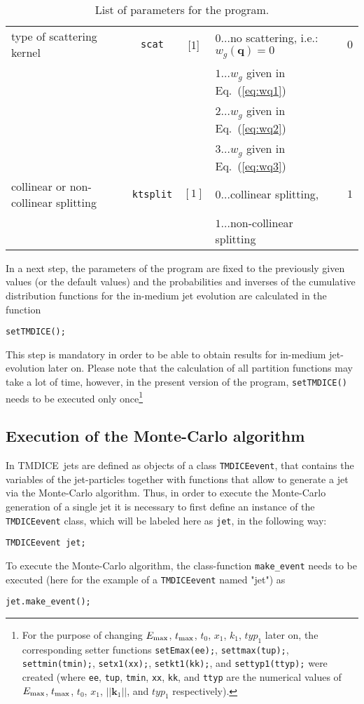 \documentclass[preprint,12pt]{elsarticle}
\newcommand{\tmdice}{{\sf TMDICE}}
\begin{document}
\begin{table}[h!]
\begin{tabular}{p{7.5cm}|c|c|p{3.8cm}|c}
         type of scattering kernel &\verb#scat#&[1]&$0\dots$no scattering, i.e.: $w_g(\mathbf{q})=0$&$0$\\&&& $1\dots w_g$ given in Eq.~(\ref{eq:wq1})
         \\&&& $2\dots w_g$ given in Eq.~(\ref{eq:wq2})
         \\&&& $3\dots w_g$ given in Eq.~(\ref{eq:wq3})&
         \\
         collinear or non-collinear splitting&\verb#ktsplit#&$[1]$&$0\dots$collinear splitting,&$1$\\
         &&&$1\dots$non-collinear splitting\\
     \end{tabular}
    \caption{List of parameters for the program.}
    \label{tab:med_params}
\end{table}

In a next step, the parameters of the program are fixed to the previously given values (or the default values) and the probabilities and inverses of the cumulative distribution functions for the in-medium jet evolution are calculated in the function 
\begin{verbatim}
setTMDICE();
\end{verbatim}
This step is mandatory in order to be able to obtain results for in-medium jet-evolution later on.
Please note that the calculation of all partition functions may take a lot of time, however, in the present version of the program, \verb#setTMDICE()# needs to be executed only once\footnote{For the purpose of changing $E_{\rm max}$, $t_{\rm max}$, $t_0$, $x_1$, $k_1$, $typ_1$ later on, the corresponding setter functions \verb|setEmax(ee);|, \verb|settmax(tup);|, \verb|settmin(tmin);|, \verb|setx1(xx);|, \verb|setkt1(kk);|, and \verb|settyp1(ttyp);| were created (where \verb|ee|, \verb|tup|, \verb|tmin|, \verb|xx|, \verb|kk|, and \verb|ttyp| are the numerical values of $E_{\rm max}$, $t_{\rm max}$, $t_0$, $x_1$, $||\mathbf{k}_1||$, and $typ_1$ respectively).}
%
\subsection{Execution of the Monte-Carlo algorithm}
%
In \tmdice\, jets are defined as objects of a class \verb#TMDICEevent#, that contains the variables of the jet-particles together with functions that allow to generate a jet via the Monte-Carlo algorithm. 
Thus, in order to execute the Monte-Carlo generation of a single jet it is necessary to first define an instance of the \verb#TMDICEevent# class, which will be labeled here as \verb#jet#, in the following way:
\begin{verbatim}
TMDICEevent jet;
\end{verbatim}
To execute the Monte-Carlo algorithm, the class-function \verb#make_event# needs to be executed (here for the example of a \verb#TMDICEevent# named "jet") as
\begin{verbatim}
jet.make_event();
\end{verbatim}
\end{document}

